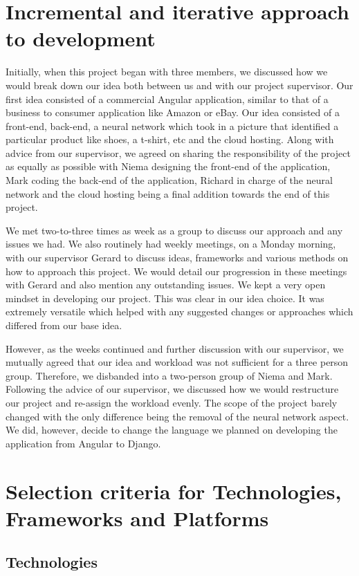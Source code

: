 \section{Incremental and iterative approach to development}
Initially, when this project began with three members, we discussed how we would break down our idea both between us and with our project supervisor. Our first idea consisted of a commercial Angular application, similar to that of a business to consumer application like Amazon or eBay. Our idea consisted of a front-end, back-end, a neural network which took in a picture that identified a particular product like shoes, a t-shirt, etc and the cloud hosting. Along with advice from our supervisor,  we agreed on sharing the responsibility of the project as equally as possible with Niema designing the front-end of the application, Mark coding the back-end of the application, Richard in charge of the neural network and the cloud hosting being a final addition towards the end of this project.

We met two-to-three times as week as a group to discuss our approach and any issues we had. We also routinely had weekly meetings, on a Monday morning, with our supervisor Gerard to discuss ideas, frameworks and various methods on how to approach this project. We would detail our progression in these meetings with Gerard and also mention any outstanding issues.
We kept a very open mindset in developing our project. This was clear in our idea choice. It was extremely versatile which helped with any suggested changes or approaches which differed from our base idea. 

However, as the weeks continued and further discussion with our supervisor, we mutually agreed that our idea and workload was not sufficient for a three person group. Therefore, we disbanded into a two-person group of Niema and Mark. Following the advice of our supervisor, we discussed how we would restructure our project and re-assign the workload evenly. The scope of the project barely changed with the only difference being the removal of the neural network aspect. We did, however, decide to change the language we planned on developing the application from Angular to Django.

\section{Selection criteria for Technologies, Frameworks and Platforms}

\subsection{Technologies}
